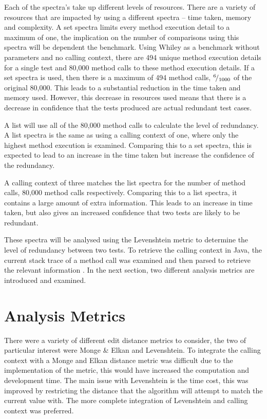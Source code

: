 Each of the spectra's take up different levels of resources. There are a variety of resources that are impacted by using a different spectra -- time taken, memory and complexity. A set spectra limits every method execution detail to a maximum of one, the implication on the number of comparisons using this spectra will be dependent the benchmark. Using Whiley as a benchmark without parameters and no calling context, there are 494 unique method execution details for a single test and 80,000 method calls to these method execution details. If a set spectra is used, then there is a maximum of 494 method calls, ${}^{6}\!/_{1000}$ of the original 80,000. This leads to a substantial reduction in the time taken and memory used. However, this decrease in resources used means that there is a decrease in confidence that the tests produced are actual redundant test cases.

A list will use all of the 80,000 method calls to calculate the level of redundancy. A list spectra is the same as using a calling context of one, where only the highest method execution is examined. Comparing this to a set spectra, this is expected to lead to an increase in the time taken but increase the confidence of the redundancy.

A calling context of three matches the list spectra for the number of method calls, 80,000 method calls respectively. Comparing this to a list spectra, it contains a large amount of extra information. This leads to an increase in time taken, but also gives an increased confidence that two tests are likely to be redundant. 

These spectra will be analysed using the Levenshtein metric to determine the level of redundancy between two tests. To retrieve the calling context in Java, the current stack trace  of a method call was examined and then parsed to retrieve the relevant information . In the next section, two different analysis metrics are introduced and examined.

\section{Analysis Metrics}
\label{S:metrics}

There were a variety of different edit distance metrics to consider, the two of particular interest were Monge \& Elkan and Levenshtein. To integrate the calling context with a Monge and Elkan distance metric was difficult due to the implementation of the metric, this would have increased the computation and development time. The main issue with Levenshtein is the time cost, this was improved by restricting the distance that the algorithm will attempt to match the current value with. The more complete integration of Levenshtein and calling context was preferred. 


